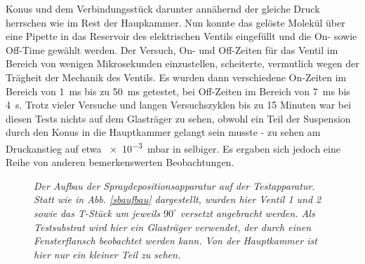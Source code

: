  Konus und dem Verbindungsstück darunter annähernd der gleiche Druck herrschen wie im Rest der
 Haupkammer. Nun konnte das gelöste Molekül über eine Pipette in das Reservoir des elektrischen
 Ventils eingefüllt und die On- sowie Off-Time gewählt werden. Der Versuch, On- und Off-Zeiten für
 das Ventil im Bereich von wenigen Mikrosekunden einzustellen, scheiterte, vermutlich wegen der
 Trägheit der Mechanik des Ventils. Es wurden dann verschiedene On-Zeiten im Bereich von \SI{1}{ms}
 bis zu \SI{50}{ms} getestet, bei Off-Zeiten im Bereich von \SI{7}{ms} bis \SI{4}{s}. Trotz vieler
 Versuche und langen Versuchszyklen bis zu 15 Minuten war bei diesen Tests nichts auf dem
 Glasträger zu sehen, obwohl ein Teil der Suspension durch den Konus in die Hauptkammer gelangt
 sein musste - zu sehen am Druckanstieg auf etwa \SI{e-3}{mbar} in selbiger. Es ergaben sich jedoch
 eine Reihe von anderen bemerkenswerten Beobachtungen.
 \\

 
\begin{figure}[H]
	\centering
	\sffamily
	
	\caption{\textit{Der Aufbau der Spraydepositionsapparatur auf der Testapparatur. Statt wie in Abb.
	\ref{sbaufbau} dargestellt, wurden hier Ventil 1 und 2 sowie das T-Stück um jeweils $90^{\circ}$
	versetzt angebracht werden. Als Testsubstrat wird hier ein Glasträger verwendet, der durch einen
	Fensterflansch beobachtet werden kann. Von der Hauptkammer ist hier nur ein kleiner Teil zu
	sehen.}}
\label{aufbau}
\end{figure}
 
 


 

